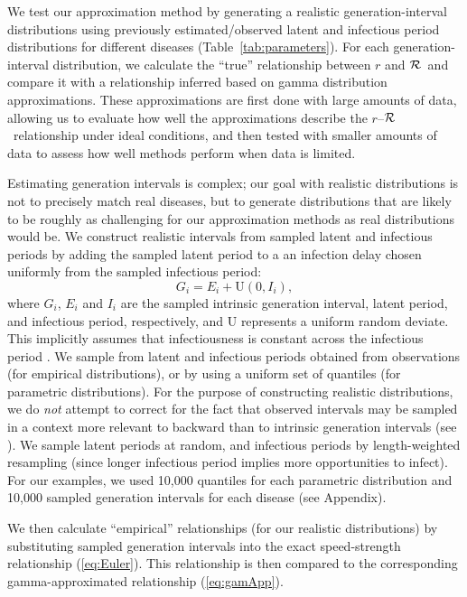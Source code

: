 \documentclass[12pt]{article}
\newcommand{\rR}{\mbox{$r$--$\cal R$}}
\newcommand{\RR}{\ensuremath{{\cal R}}}
\newcommand{\eref}[1]{(\ref{eq:#1})}
\newcommand{\tref}[1]{Table~\ref{tab:#1}}
\begin{document}
We test our approximation method by generating a realistic generation-interval distributions using previously estimated/observed latent and infectious period distributions for different diseases (\tref{parameters}).
For each generation-interval distribution, we calculate the ``true'' relationship between $r$ and \RR\ and compare it with a relationship inferred based on gamma distribution approximations. 
These approximations are first done with large amounts of data, allowing us to evaluate how well the approximations describe the \rR\ relationship under ideal conditions, and then tested with smaller amounts of data to assess how well methods perform when data is limited. 

Estimating generation intervals is complex; our goal with realistic distributions is not to precisely match real diseases, but to generate distributions that are likely to be roughly as challenging for our approximation methods as real distributions would be.
We construct realistic intervals from sampled latent and infectious periods by adding the sampled latent period to a an infection delay chosen uniformly from the sampled infectious period:
\begin{equation}
	G_i = E_i + \mathrm{U}(0, I_i),
\end{equation}
where $G_i$, $E_i$ and $I_i$ are the sampled intrinsic generation interval, latent period, and infectious period, respectively, and $\mathrm{U}$ represents a uniform random deviate.
This implicitly assumes that infectiousness is constant across the infectious period \cite{HampDush09}.
We sample from latent and infectious periods obtained from observations (for empirical distributions), or by using a uniform set of quantiles (for parametric distributions).
For the purpose of constructing realistic distributions, we do \emph{not} attempt to correct for the fact that observed intervals may be sampled in a context more relevant to backward than to intrinsic generation intervals (see \cite{ChamDush15}).
We sample latent periods at random, and infectious periods by length-weighted resampling (since longer infectious period implies more opportunities to infect).
For our examples, we used 10,000 quantiles for each parametric distribution and 10,000 sampled generation intervals for each disease (see Appendix).


We then calculate ``empirical'' relationships (for our realistic distributions) by substituting sampled generation intervals into the exact speed-strength relationship \eref{Euler}.
This relationship is then compared to the corresponding gamma-approximated relationship \eref{gamApp}.
\end{document}
